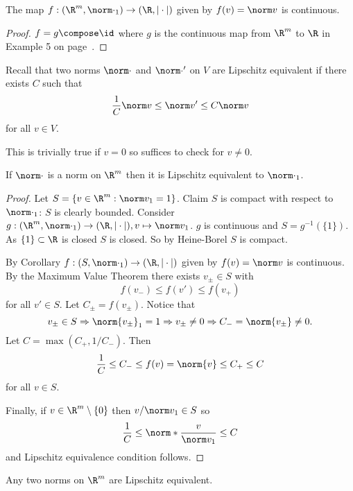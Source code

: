 \documentclass[a4paper]{article}
\theoremstyle{definition}
\begin{document}
\begin{corollary}
  The map \(f:(\R^m, \norm \cdot_1) \to (\R, |\cdot|)\) given by \(f(v) = \norm v\) is continuous.
\end{corollary}

\begin{proof}
  \(f = g\compose \id\) where \(g\) is the continuous map from \(\R^m\) to \(\R\) in Example 5 on page~\pageref{eg:continuity}.
\end{proof}

Recall that two norms \(\norm \cdot\) and \(\norm \cdot'\) on \(V\) are Lipschitz equivalent if there exists \(C\) such that
\[
  \frac{1}{C} \norm v \leq \norm v' \leq C \norm v
\]
for all \(v\in V\).

\begin{remark}
  This is trivially true if \(v=0\) so suffices to check for \(v\neq0\).
\end{remark}

\begin{theorem}
  \label{thm:Lipschitz equivalence}
  If \(\norm \cdot\) is a norm on \(\R^m\) then it is Lipschitz equivalent to \(\norm \cdot_1\).
\end{theorem}

\begin{proof}
  \label{proof:Lipschitz equivalence}
  Let \(S = \{v\in \R^m: \norm v_1 = 1 \}\). Claim \(S\) is compact with respect to \(\norm \cdot_1\): \(S\) is clearly bounded. Consider \(g:(\R^m, \norm \cdot_1) \to (\R, |\cdot|), v\mapsto \norm v_1\). \(g\) is continuous and \(S = g^{-1}(\{1\})\). As \(\{1\} \subset \R\) is closed \(S\) is closed. So by Heine-Borel \(S\) is compact.

  By Corollary \(f:(S, \norm \cdot_1) \to (\R, |\cdot|)\) given by \(f(v) = \norm v\) is continuous. By the Maximum Value Theorem there exists \(v_\pm\in S\) with
  \[
    f(v_-) \leq f(v') \leq f(v_+)
  \]
  for all \(v' \in S\). Let \(C_\pm = f(v_\pm)\). Notice that
  \[
    v_\pm\in S \Rightarrow \norm{v_\pm}_1 = 1 \Rightarrow v_\pm \neq0 \Rightarrow C_-=\norm{v_\pm} \neq 0.
  \]
  Let \(C = \max(C_+,1/C_-)\). Then
  \[
    \frac{1}{C} \leq C_- \leq f(v) = \norm{v} \leq C_+ \leq C
  \]
  for all \(v \in S\).

  Finally, if \(v \in \R^m\setminus\{0\}\) then \(v/\norm v_1 \in S\) so
  \[
    \frac{1}{C} \leq \norm*{\frac{v}{\norm v_1}} \leq C
  \]
  and Lipschitz equivalence condition follows.
\end{proof}

\begin{corollary}
  Any two norms on \(\R^m\) are Lipschitz equivalent.
\end{corollary}
\end{document}
